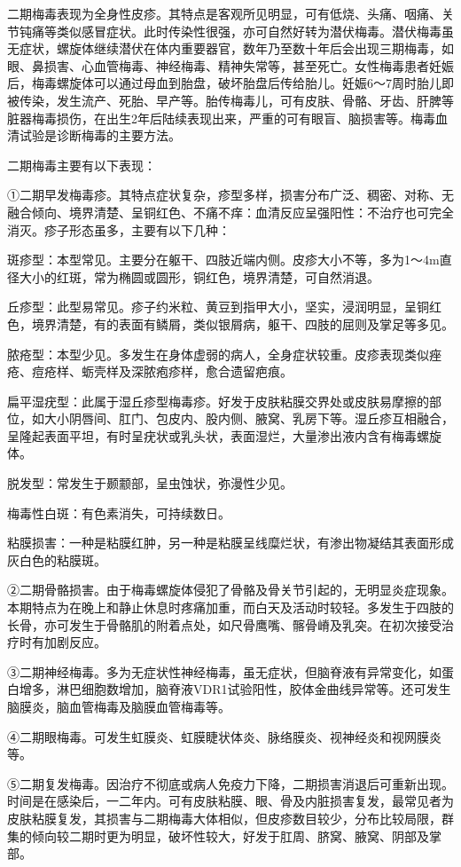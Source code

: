 \documentclass[12pt,UTF8,openany]{ctexbook}
\begin{document}
二期梅毒表现为全身性皮疹。其特点是客观所见明显，可有低烧、头痛、咽痛、关节钝痛等类似感冒症状。此时传染性很强，亦可自然好转为潜伏梅毒。潜伏梅毒虽无症状，螺旋体继续潜伏在体内重要器官，数年乃至数十年后会出现三期梅毒，如眼、鼻损害、心血管梅毒、神经梅毒、精神失常等，甚至死亡。女性梅毒患者妊娠后，梅毒螺旋体可以通过母血到胎盘，破坏胎盘后传给胎儿。妊娠6～7周时胎儿即被传染，发生流产、死胎、早产等。胎传梅毒儿，可有皮肤、骨骼、牙齿、肝脾等脏器梅毒损伤，在出生2年后陆续表现出来，严重的可有眼盲、脑损害等。梅毒血清试验是诊断梅毒的主要方法。

二期梅毒主要有以下表现：

①二期早发梅毒疹。其特点症状复杂，疹型多样，损害分布广泛、稠密、对称、无融合倾向、境界清楚、呈铜红色、不痛不痒：血清反应呈强阳性：不治疗也可完全消灭。疹子形态虽多，主要有以下几种：

斑疹型：本型常见。主要分在躯干、四肢近端内侧。皮疹大小不等，多为1～4m直径大小的红斑，常为椭圆或圆形，铜红色，境界清楚，可自然消退。

丘疹型：此型易常见。疹子约米粒、黄豆到指甲大小，坚实，浸润明显，呈铜红色，境界清楚，有的表面有鳞屑，类似银屑病，躯干、四肢的屈则及掌足等多见。

脓疮型：本型少见。多发生在身体虚弱的病人，全身症状较重。皮疹表现类似痤疮、痘疮样、蛎壳样及深脓疱疹样，愈合遗留疤痕。

扁平湿疣型：此属于湿丘疹型梅毒疹。好发于皮肤粘膜交界处或皮肤易摩擦的部位，如大小阴唇间、肛门、包皮内、股内侧、腋窝、乳房下等。湿丘疹互相融合，呈隆起表面平坦，有时呈疣状或乳头状，表面湿烂，大量渗出液内含有梅毒螺旋体。

脱发型：常发生于颞颥部，呈虫蚀状，弥漫性少见。

梅毒性白斑：有色素消失，可持续数日。

粘膜损害：一种是粘膜红肿，另一种是粘膜呈线糜烂状，有渗出物凝结其表面形成灰白色的粘膜斑。

②二期骨骼损害。由于梅毒螺旋体侵犯了骨骼及骨关节引起的，无明显炎症现象。本期特点为在晚上和静止休息时疼痛加重，而白天及活动时较轻。多发生于四肢的长骨，亦可发生于骨骼肌的附着点处，如尺骨鹰嘴、髂骨嵴及乳突。在初次接受治疗时有加剧反应。

③二期神经梅毒。多为无症状性神经梅毒，虽无症状，但脑脊液有异常变化，如蛋白增多，淋巴细胞数增加，脑脊液VDR1试验阳性，胶体金曲线异常等。还可发生脑膜炎，脑血管梅毒及脑膜血管梅毒等。

④二期眼梅毒。可发生虹膜炎、虹膜睫状体炎、脉络膜炎、视神经炎和视网膜炎等。

⑤二期复发梅毒。因治疗不彻底或病人免疫力下降，二期损害消退后可重新出现。时间是在感染后，一二年内。可有皮肤粘膜、眼、骨及内脏损害复发，最常见者为皮肤粘膜复发，其损害与二期梅毒大体相似，但皮疹数目较少，分布比较局限，群集的倾向较二期时更为明显，破坏性较大，好发于肛周、脐窝、腋窝、阴部及掌部。
\end{document}
